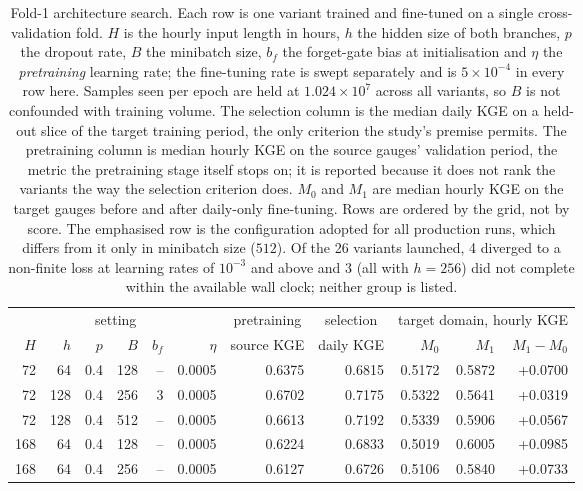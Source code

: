 \begin{table}[H]
\caption{Fold-1 architecture search. Each row is one variant trained and fine-tuned on a single cross-validation fold. $H$ is the hourly input length in hours, $h$ the hidden size of both branches, $p$ the dropout rate, $B$ the minibatch size, $b_f$ the forget-gate bias at initialisation and $\eta$ the \emph{pretraining} learning rate; the fine-tuning rate is swept separately and is $5\times10^{-4}$ in every row here. Samples seen per epoch are held at $1.024\times10^{7}$ across all variants, so $B$ is not confounded with training volume. The selection column is the median daily KGE on a held-out slice of the target training period, the only criterion the study's premise permits. The pretraining column is median hourly KGE on the source gauges' validation period, the metric the pretraining stage itself stops on; it is reported because it does not rank the variants the way the selection criterion does. $M_0$ and $M_1$ are median hourly KGE on the target gauges before and after daily-only fine-tuning. Rows are ordered by the grid, not by score. The emphasised row is the configuration adopted for all production runs, which differs from it only in minibatch size ($512$). Of the 26 variants launched, 4 diverged to a non-finite loss at learning rates of $10^{-3}$ and above and 3 (all with $h=256$) did not complete within the available wall clock; neither group is listed.}
\label{tab:search}
\centering
\begin{tabular}{rrrrrr r r rrr}
\toprule
\multicolumn{6}{c}{setting} & \multicolumn{1}{c}{pretraining} & \multicolumn{1}{c}{selection} & \multicolumn{3}{c}{target domain, hourly KGE} \\
\cmidrule(lr){1-6} \cmidrule(lr){7-7} \cmidrule(lr){8-8} \cmidrule(lr){9-11}
$H$ & $h$ & $p$ & $B$ & $b_f$ & $\eta$ & source KGE & daily KGE & $M_0$ & $M_1$ & $M_1-M_0$ \\
\midrule
  72 & 64 & 0.4 & 128 & -- & 0.0005 & 0.6375 & 0.6815 & 0.5172 & 0.5872 & +0.0700 \\
  72 & 128 & 0.4 & 256 & 3 & 0.0005 & 0.6702 & 0.7175 & 0.5322 & 0.5641 & +0.0319 \\
  72 & 128 & 0.4 & 512 & -- & 0.0005 & 0.6613 & 0.7192 & 0.5339 & 0.5906 & +0.0567 \\
  168 & 64 & 0.4 & 128 & -- & 0.0005 & 0.6224 & 0.6833 & 0.5019 & 0.6005 & +0.0985 \\
  168 & 64 & 0.4 & 256 & -- & 0.0005 & 0.6127 & 0.6726 & 0.5106 & 0.5840 & +0.0733 \\

\end{tabular}
\end{table}
